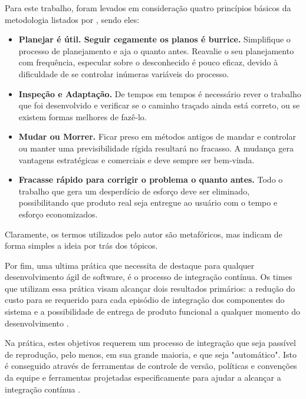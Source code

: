 Para este trabalho, foram levados em consideração quatro princípios básicos da metodologia listados por \cite{scrum2014}, sendo eles: 
	\begin{itemize}
		\item \textbf{Planejar é útil. Seguir cegamente os planos é burrice.} Simplifique o processo de planejamento e aja o quanto antes. Reavalie o seu planejamento com frequência, especular sobre o desconhecido é pouco eficaz, devido à dificuldade de se controlar inúmeras variáveis do processo.
		\item \textbf{Inspeção e Adaptação.} De tempos em tempos é necessário rever o trabalho que foi desenvolvido e verificar se o caminho traçado ainda está correto, ou se existem formas melhores de fazê-lo.
		\item \textbf{Mudar ou Morrer.} Ficar preso em métodos antigos de mandar e controlar ou manter uma previsibilidade rígida resultará no fracasso. A mudança gera vantagens estratégicas e comerciais e deve sempre ser bem-vinda.
		\item \textbf{Fracasse rápido para corrigir o problema o quanto antes.} Todo o trabalho que gera um desperdício de esforço deve ser eliminado, possibilitando que produto real seja entregue ao usuário com o tempo e esforço economizados.
	\end{itemize}
	
Claramente, os termos utilizados pelo autor são metafóricos, mas indicam de forma simples a ideia por trás dos tópicos.

Por fim, uma ultima prática que necessita de destaque para qualquer desenvolvimento ágil de software,  é o processo de integração contínua. Os times que utilizam essa prática visam alcançar dois resultados primários: a redução do custo para se requerido para cada episódio de integração dos componentes do sistema e a possibilidade de entrega de produto funcional a qualquer momento do desenvolvimento \cite{agile2015}.

Na prática, estes objetivos requerem um processo de integração que seja passível de reprodução, pelo menos, em sua grande maioria, e que seja "automático". Isto é conseguido através de ferramentas de controle de versão, políticas e convenções da equipe e ferramentas projetadas especificamente para ajudar a alcançar a integração contínua \cite{agile2015}.

